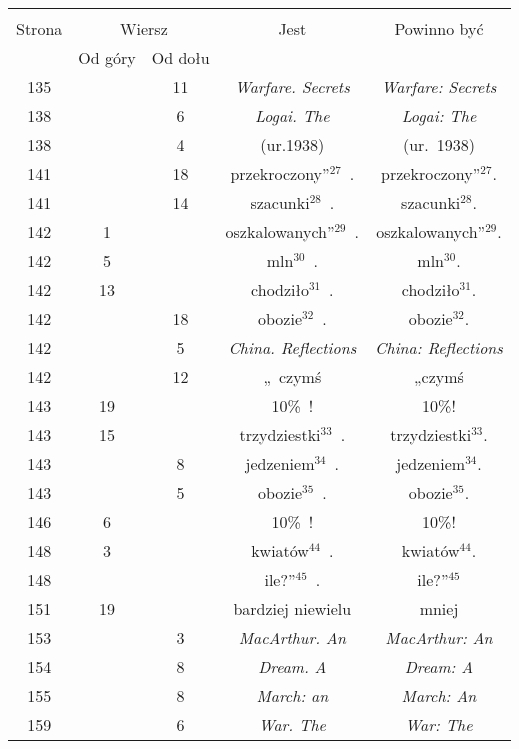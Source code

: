 \documentclass[a4paper,11pt]{article}
\begin{document}
\begin{center}
  \begin{tabular}{|c|c|c|c|c|}
    \hline
    & \multicolumn{2}{c|}{} & & \\
    Strona & \multicolumn{2}{c|}{Wiersz} & Jest
                              & Powinno być \\ \cline{2-3}
    & Od góry & Od dołu & & \\
    \hline
    135 & & 11 & \emph{Warfare. Secrets} & \emph{Warfare: Secrets} \\
    138 & &  6 & \emph{Logai. The} & \emph{Logai: The} \\
    138 & &  4 & (ur.1938) & (ur.~1938) \\
    141 & & 18 & przekroczony''$^{ 27 }$~. & przekroczony''$^{ 27 }$. \\
    141 & & 14 & szacunki$^{ 28 }$~. & szacunki$^{ 28 }$. \\
    142 &  1 & & oszkalowanych''$^{ 29 }$~. & oszkalowanych''$^{ 29 }$. \\
    142 &  5 & & mln$^{ 30 }$~. & mln$^{ 30 }$. \\
    142 & 13 & & chodziło$^{ 31 }$~. & chodziło$^{ 31 }$. \\
    142 & & 18 & obozie$^{ 32 }$~. & obozie$^{ 32 }$. \\
    142 & &  5 & \emph{China. Reflections} & \emph{China: Reflections} \\
    142 & & 12 & „~czymś & „czymś \\
    143 & 19 & & 10\%~! & 10\%! \\
    143 & 15 & & trzydziestki$^{ 33 }$~. & trzydziestki$^{ 33 }$. \\
    143 & &  8 & jedzeniem$^{ 34 }$~. & jedzeniem$^{ 34 }$. \\
    143 & &  5 & obozie$^{ 35 }$~.  & obozie$^{ 35 }$. \\
    146 &  6 & & 10\%~! & 10\%! \\
    148 &  3 & & kwiatów$^{ 44 }$~. & kwiatów$^{ 44 }$. \\
    148 & & & ile?”$^{ 45 }$~. & ile?”$^{ 45 }$ \\
    151 & 19 & & bardziej niewielu & mniej \\
    153 & &  3 & \emph{MacArthur. An} & \emph{MacArthur: An} \\
    154 & &  8 & \emph{Dream. A} & \emph{Dream: A} \\
    155 & &  8 & \emph{March: an} & \emph{March: An} \\
    159 & &  6 & \emph{War. The} & \emph{War: The} \\

\end{tabular}
\end{center}
\end{document}
